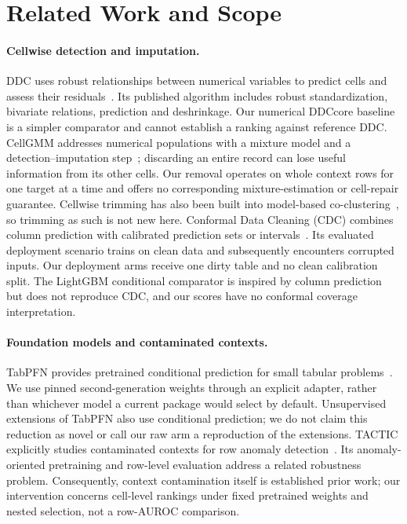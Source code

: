\section{Related Work and Scope}
\paragraph{Cellwise detection and imputation.}
DDC uses robust relationships between numerical variables to predict cells and assess
their residuals~\cite{rousseeuw2018ddc}. Its published algorithm includes robust
standardization, bivariate relations, prediction and deshrinkage. Our numerical
DDCcore baseline is a simpler comparator and cannot establish a ranking against
reference DDC. CellGMM addresses numerical populations with a mixture model
and a detection--imputation step~\cite{zaccaria2025cellgmm}; discarding an entire
record can lose useful information from its other cells. Our removal operates
on whole context rows for one target at a time and offers no corresponding
mixture-estimation or cell-repair guarantee. Cellwise trimming has also been built
into model-based co-clustering~\cite{fibbi2026celltricc}, so trimming as such is not new here. Conformal Data Cleaning (CDC) combines column prediction with
calibrated prediction sets or intervals~\cite{jager2024cdc}. Its evaluated deployment
scenario trains on clean data and subsequently encounters corrupted inputs.
Our deployment arms receive one dirty table and no clean calibration split.
The LightGBM conditional comparator is inspired by column prediction but does not
reproduce CDC, and our scores have no conformal coverage interpretation.

\paragraph{Foundation models and contaminated contexts.}
TabPFN provides pretrained conditional prediction for small tabular
problems~\cite{hollmann2025tabpfn}. We use pinned second-generation weights through
an explicit adapter, rather than whichever model a current package would select
by default. Unsupervised extensions of TabPFN also use conditional prediction;
we do not claim this reduction as novel or call our raw arm a reproduction of
the extensions. TACTIC explicitly studies contaminated contexts for row anomaly
detection~\cite{tactic2026}. Its anomaly-oriented pretraining and row-level
evaluation address a related robustness problem. Consequently, context contamination
itself is established prior work; our intervention concerns cell-level rankings
under fixed pretrained weights and nested selection, not a row-AUROC comparison.

